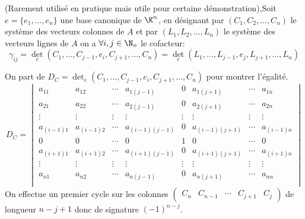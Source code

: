 \begin{prop}
(Rarement utilisé en pratique mais utile pour certaine démonstration),Soit $e=\{e_1,\dots,e_n\}$ une base canonique de $\K^n$, en désignant par $(C_1,C_2,\dots,C_n)$ le système des vecteurs colonnes de $A$ et 
par $(L_1,L_2,\dots,L_n)$ le système des vecteurs lignes de $A$ on a $\forall i,j\in\N_n$ le cofacteur:
$$\gamma_{ij}=\det_e(C_1,\dots,C_{j-1},e_i,C_{j+1},\dots,C_n)=\det_e(L_1,\dots,L_{j-1},e_j,L_{j+1},\dots,L_n)$$


\tcblower

On part de $D_C=\det_e(C_1,\dots,C_{j-1},e_i,C_{j+1},\dots,C_n)$ pour montrer l'égalité.
\[D_C=\begin{vmatrix}
a_{11} & a_{12} & \cdots &a_{1(j-1)}& 0 &a_{1(j+1)}& \cdots & a_{1n} \\
a_{21} & a_{22} & \cdots & a_{2(j-1)}& 0 &a_{2(j+1)}& \cdots & a_{2n} \\
\vdots & \vdots & \vdots & \vdots & \vdots & \vdots & \vdots & \vdots  \\
a_{(i-1)1} & a_{(i-1)2} & \cdots & a_{(i-1)(j-1)}& 0 &a_{(i-1)(j+1)}& \cdots & a_{(i-1)n} \\
0&0&\cdots&0&1&0&\cdots&0\\
a_{(i+1)1} & a_{(i+1)2} & \cdots & a_{(i+1)(j-1)}& 0 &a_{(i+1)(j+1)}& \cdots & a_{(i+1)n} \\
\vdots & \vdots & \vdots & \vdots & \vdots & \vdots & \vdots & \vdots  \\
a_{n1} & a_{n2} & \cdots &a_{n(j-1)}& 0 &a_{n(j+1)}& \cdots & a_{nn} \\
\end{vmatrix}\] On effectue un premier cycle sur les colonnes $\begin{pmatrix}
C_n & C_{n-1} & \cdots & C_{j+1} & C_j
\end{pmatrix}$ de longueur $n-j+1$ donc de signature $(-1)^{n-j}$.


\end{prop}
